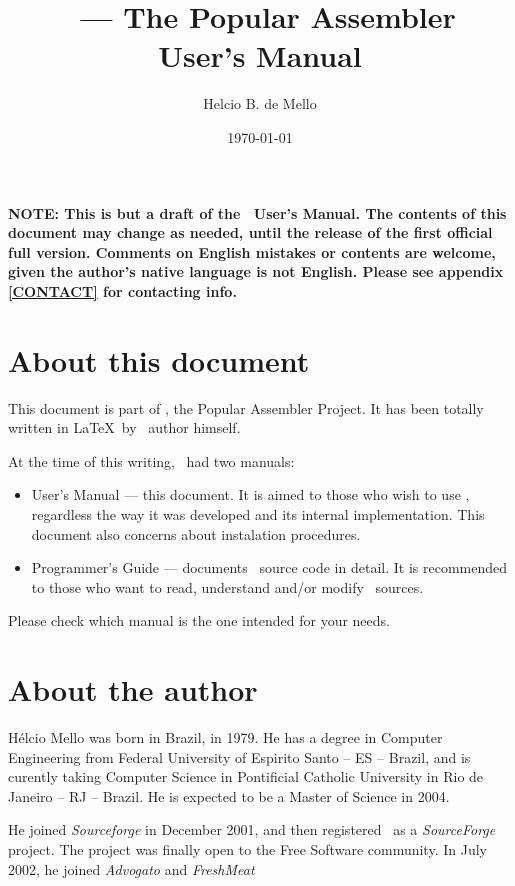 \documentclass[a4paper,draft,12pt]{book}
\title{\popasm\ --- The Popular Assembler\\User's Manual}
\author{Helcio B. de Mello}
\date{\today}
\begin{document}
\begin{titlepage}
\maketitle
\end{titlepage}


\bf{NOTE:} This is but a draft of the \popasm\ User's Manual. The
contents of this document may change as needed, until the release
of the first official full version. Comments on English mistakes
or contents are welcome, given the author's native language is not
English. Please see appendix \ref{CONTACT} for contacting info.

\chapter*{About this document}
This document is part of \popasm, the Popular Assembler Project.
It has been totally written in \LaTeX\ by
\popasm\ author himself.

At the time of this writing, \popasm\ had two manuals:

\begin{itemize}
\item{User's Manual} --- this document. It is aimed to those who wish
to use \popasm, regardless the way
it was developed and its internal implementation. This document also
concerns about instalation procedures.
\item{Programmer's Guide} --- documents \popasm\ source code in
detail. It is recommended to those who
want to read, understand and/or modify \popasm\ sources.
\end{itemize}

Please check which manual is the one intended for your needs.

\chapter*{About the author}
H\'elcio Mello was born in Brazil, in 1979. He has a degree in Computer
Engineering from Federal University of
Espirito Santo -- ES -- Brazil\cite{UFES}, and is curently taking
Computer Science in Pontificial Catholic
University in Rio de Janeiro -- RJ -- Brazil\cite{PUC}. He is expected
to be a Master of Science in 2004.

He joined \emph{Sourceforge}\cite{SF} in December 2001, and then
registered \popasm\ as a \emph{SourceForge}
project. The project was finally open to the Free Software community.
In July 2002, he joined \emph{Advogato}
\cite{ADV,ADVPRSN} and \emph{FreshMeat}\cite{FRESH}
\end{document}
